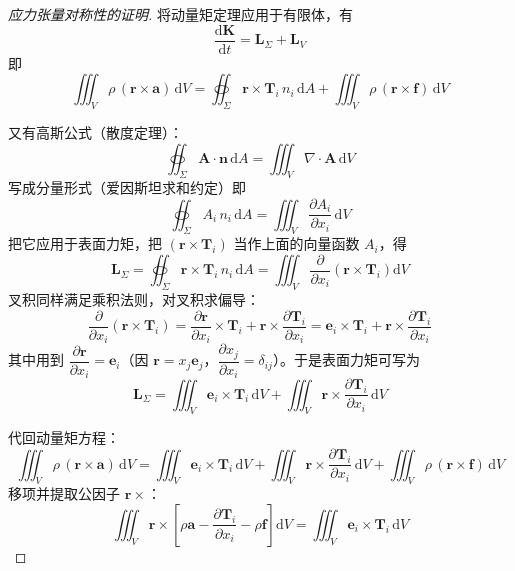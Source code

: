 \begin{proof}[应力张量对称性的证明]
	将动量矩定理应用于有限体，有
	\begin{equation}
		\frac{\mathrm{d}\boldsymbol{K}}{\mathrm{d}t}=\boldsymbol{L}_\Sigma+\boldsymbol{L}_V
	\end{equation}
	即
	\begin{equation}
		\iiint_V\rho\,(\boldsymbol{r}\times\boldsymbol{a})\,\mathrm{d}V=\oiint_\Sigma\boldsymbol{r}\times\boldsymbol{T}_i\,n_i\,\mathrm{d}A+\iiint_V\rho\,(\boldsymbol{r}\times\boldsymbol{f})\,\mathrm{d}V
	\end{equation}

	又有高斯公式（散度定理）：
	\begin{equation}
		\oiint_\Sigma\boldsymbol{A}\cdot\boldsymbol{n}\,\mathrm{d}A=\iiint_V\nabla\cdot\boldsymbol{A}\,\mathrm{d}V
	\end{equation}
	写成分量形式（爱因斯坦求和约定）即
	\begin{equation}
		\oiint_\Sigma A_i\,n_i\,\mathrm{d}A=\iiint_V\frac{\partial A_i}{\partial x_i}\,\mathrm{d}V
	\end{equation}
	把它应用于表面力矩，把 $(\boldsymbol{r}\times\boldsymbol{T}_i)$ 当作上面的向量函数 $A_i$，得
	\begin{equation}
		\boldsymbol{L}_\Sigma=\oiint_\Sigma\boldsymbol{r}\times\boldsymbol{T}_i\,n_i\,\mathrm{d}A=\iiint_V\frac{\partial}{\partial x_i}\left(\boldsymbol{r}\times\boldsymbol{T}_i\right)\mathrm{d}V
	\end{equation}
	叉积同样满足乘积法则，对叉积求偏导：
	\begin{equation}
		\frac{\partial}{\partial x_i}\left(\boldsymbol{r}\times\boldsymbol{T}_i\right)=\frac{\partial\boldsymbol{r}}{\partial x_i}\times\boldsymbol{T}_i+\boldsymbol{r}\times\frac{\partial\boldsymbol{T}_i}{\partial x_i}=\boldsymbol{e}_i\times\boldsymbol{T}_i+\boldsymbol{r}\times\frac{\partial\boldsymbol{T}_i}{\partial x_i}
	\end{equation}
	其中用到 $\dfrac{\partial\boldsymbol{r}}{\partial x_i}=\boldsymbol{e}_i$（因 $\boldsymbol{r}=x_j\boldsymbol{e}_j$，$\dfrac{\partial x_j}{\partial x_i}=\delta_{ij}$）。于是表面力矩可写为
	\begin{equation}
		\boldsymbol{L}_\Sigma=\iiint_V\boldsymbol{e}_i\times\boldsymbol{T}_i\,\mathrm{d}V+\iiint_V\boldsymbol{r}\times\frac{\partial\boldsymbol{T}_i}{\partial x_i}\,\mathrm{d}V
	\end{equation}

	代回动量矩方程：
	\begin{equation}
		\iiint_V\rho\,(\boldsymbol{r}\times\boldsymbol{a})\,\mathrm{d}V=\iiint_V\boldsymbol{e}_i\times\boldsymbol{T}_i\,\mathrm{d}V+\iiint_V\boldsymbol{r}\times\frac{\partial\boldsymbol{T}_i}{\partial x_i}\,\mathrm{d}V+\iiint_V\rho\,(\boldsymbol{r}\times\boldsymbol{f})\,\mathrm{d}V
	\end{equation}
	移项并提取公因子 $\boldsymbol{r}\times$：
	\begin{equation}
		\iiint_V\boldsymbol{r}\times\left[\rho\boldsymbol{a}-\frac{\partial\boldsymbol{T}_i}{\partial x_i}-\rho\boldsymbol{f}\right]\mathrm{d}V=\iiint_V\boldsymbol{e}_i\times\boldsymbol{T}_i\,\mathrm{d}V
	\end{equation}


\end{proof}
